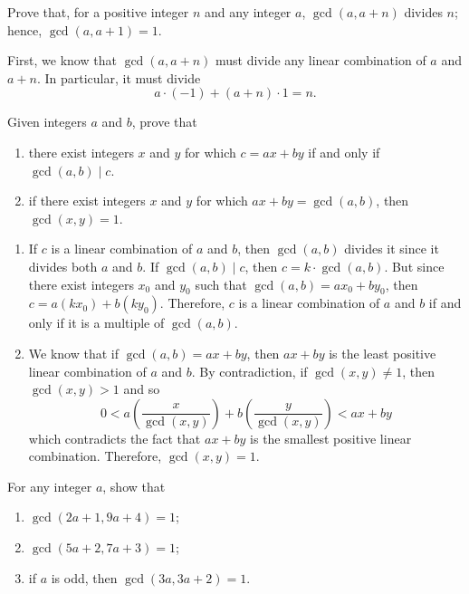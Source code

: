 \begin{exercise}
    Prove that, for a positive integer $n$ and any integer $a$, $\gcd(a, a+n)$ divides $n$; hence, $\gcd(a, a+1) = 1$. \\
\end{exercise}

\begin{solution}
    First, we know that $\gcd(a, a+n)$ must divide any linear combination of $a$ and $a+n$. In particular, it must divide
    $$a\cdot(-1) + (a+n)\cdot 1 = n.$$ 
\end{solution}

\begin{exercise}
    Given integers $a$ and $b$, prove that
    \begin{enumerate}
        \item there exist integers $x$ and $y$ for which $c = ax+by$ if and only if $\gcd(a,b) \mid c$.
        \item if there exist integers $x$ and $y$ for which $ax + by = \gcd(a,b)$, then $\gcd(x,y) = 1$.
    \end{enumerate}
\end{exercise}

\begin{solution}
    \begin{enumerate}
        \item If $c$ is a linear combination of $a$ and $b$, then $\gcd(a,b)$ divides it since it divides both $a$ and $b$. If $\gcd(a,b) \mid c$, then $c = k \cdot \gcd(a,b)$. But since there exist integers $x_0$ and $y_0$ such that $\gcd(a,b) = ax_0 + by_0$, then $c = a(kx_0) + b(ky_0)$. Therefore, $c$ is a linear combination of $a$ and $b$ if and only if it is a multiple of $\gcd(a,b)$.
        \item We know that if $\gcd(a,b) = ax+by$, then $ax + by$ is the least positive linear combination of $a$ and $b$. By contradiction, if $\gcd(x,y) \neq 1$, then $\gcd(x,y) > 1$ and so
        $$0< a\left(\frac{x}{\gcd(x,y)}\right) + b\left(\frac{y}{\gcd(x,y)}\right) < ax+by$$
        which contradicts the fact that $ax+ by$ is the smallest positive linear combination. Therefore, $\gcd(x,y) = 1$.
    \end{enumerate}
\end{solution}

\begin{exercise}
    For any integer $a$, show that
    \begin{enumerate}
        \item $\gcd(2a+1, 9a+4) = 1$;
        \item $\gcd(5a+2, 7a+3) = 1$;
        \item if $a$ is odd, then $\gcd(3a, 3a+2) = 1$.
    \end{enumerate}
\end{exercise}

